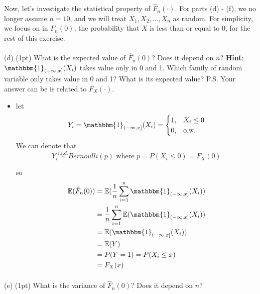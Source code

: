 \documentclass[11pt, oneside]{article}   	%
\begin{document}

Now, let's investigate the statistical property of $\hat{F}_n(\cdot)$. 
For parts (d) - (f), we no longer assume $n=10$, and we will treat $X_1, X_2, ..., X_n$ as random. 
For simplicity, we focus on in $F_n(0)$, 
the probability that $X$ is less than or equal to $0$, 
for the rest of this exercise.

\paragraph{}
(d) (1pt) What is the expected value of $\hat{F}_n(0)$? Does it depend on $n$?
		  \textbf{Hint}: $\mathbbm{1}_{(-\infty,x]}(X_i)$ takes value only in 0 and 1. 
		  Which family of random variable only takes value in 0 and 1? 
		  What is its expected value? P.S. Your answer can be is related to $F_X(\cdot)$.

\begin{itemize}
    \item[]
    let
    \[
    Y_i = \mathbbm{1}_{(-\infty,x]}(X_i) =
    \begin{cases}
    1, &X_i \leq 0\\
    0, &\mbox{o.w.}
    \end{cases}
    \]
We can denote that
\[
     Y_i \overset{i.i.d.}{\sim} Bernoulli(p) \mbox{ where } p = P(X_i \leq 0)= F_X(0)
\]

so
\begin{align*}
\mathbb{E}(\hat{F}_n(0))&=\mathbb{E}(\frac{1}{n}\sum_{i=1}^{n}\mathbbm{1}_{(-\infty,x]}(X_i))\\
&=\frac{1}{n}\sum_{i=1}^{n}\mathbb{E}(\mathbbm{1}_{(-\infty,x]}(X_i))\\
&=\mathbb{E}(\mathbbm{1}_{(-\infty,x]}(X_i))\\
&=\mathbb{E}(Y)\\
&=P(Y=1) =  P(X_i \leq x)\\
&=F_X(x)
\end{align*}
\end{itemize}

\paragraph{}
(e) (1pt) What is the variance of $\hat{F}_n(0)$? Does it depend on $n$?

\end{document}
